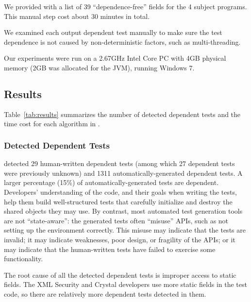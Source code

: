 We provided \ourtool with a list of 39 ``dependence-free'' fields
for the 4 subject programs. This manual step cost
about 30 minutes in total.


We examined each output dependent test manually to make
sure the test dependence is not caused by non-deter\-min\-istic
factors, such as multi-threading.

Our experiments were run on a 2.67GHz Intel Core PC
with 4GB physical memory (2GB was allocated for the JVM),
running Windows 7.

\subsection{Results}

Table~\ref{tab:results} summarizes the number of detected
dependent tests and the time cost for each algorithm
in \ourtool.

\subsubsection{Detected Dependent Tests}
\label{sec:detectedtests}


\ourtool detected 29 human-written dependent tests (among which 27
dependent tests were previously unknown) and 1311
automatically-generated dependent tests.  A larger percentage (15\%) of
automatically-generated tests are dependent.  Developers' understanding of
the code, and their goals when writing the tests, help them build
well-structured tests that carefully initialize and destroy the shared
objects they may use.
By contrast,  most automated test generation tools are not ``state-aware'': the
generated tests often ``misuse'' APIs, such as not setting up
the environment correctly.  This misuse may
indicate that the tests are invalid; it may indicate weaknesses, poor
design, or fragility of the APIs; or it may indicate that the human-written
tests have failed to exercise some functionality.


The root cause of all the detected dependent tests is improper access to
static fields. The XML Security and Crystal developers use more
static fields in the test code,
so there are relatively more dependent tests detected in them.

